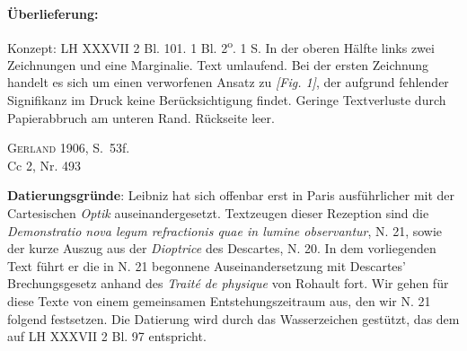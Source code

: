    
        
        \begin{ledgroupsized}[r]{120mm}
        \footnotesize 
        \pstart        
        \noindent\textbf{\"{U}berlieferung:}  
        \pend
        \end{ledgroupsized}
      
       
              \begin{ledgroupsized}[r]{114mm}
              \footnotesize 
              \pstart \parindent -6mm
              Konzept: LH XXXVII 2 Bl. 101. 1 Bl. 2\textsuperscript{o}. 1 S. In der oberen H\"{a}lfte links zwei Zeichnungen und eine Marginalie. Text umlaufend. Bei der ersten Zeichnung handelt es sich um einen verworfenen Ansatz zu \textit{[Fig. 1]}, der aufgrund fehlender Signifikanz im Druck keine Ber\"{u}cksichtigung findet. Geringe Textverluste durch Papierabbruch am unteren Rand. R\"{u}ckseite leer.\pend
              \end{ledgroupsized}
       
              \begin{ledgroupsized}[r]{114mm}
              \footnotesize 
              \pstart \parindent -6mm
              \cite{00243}\textsc{Gerland} 1906, S.~53f.\\Cc 2, Nr. 493 \pend
              \end{ledgroupsized}
        \vspace*{5mm}
        \begin{ledgroup}
        \footnotesize 
        \pstart
      \noindent\footnotesize{\textbf{Datierungsgr\"{u}nde}: Leibniz hat sich offenbar erst in Paris ausf\"{u}hrlicher mit der Cartesischen \cite{00038}\textit{Optik} auseinandergesetzt. Textzeugen dieser Rezeption sind die \textit{Demonstratio nova legum refractionis quae in lumine observantur}, \cite{00265}N. 21, sowie der kurze Auszug aus der \cite{00038}\textit{Dioptrice} des Descartes, N. 20. In dem vorliegenden Text f\"{u}hrt er die in N. 21 begonnene Auseinandersetzung mit Descartes'\protect{} Brechungsgesetz anhand des \cite{00087}\textit{Trait\'{e} de physique} von Rohault fort. Wir gehen f\"{u}r diese Texte von einem gemeinsamen Entstehungszeitraum aus, den wir N. 21 folgend festsetzen. Die Datierung wird durch das Wasserzeichen gest\"{u}tzt, das dem auf LH XXXVII 2 Bl. 97 entspricht.}
        \pend
        \end{ledgroup}
      
